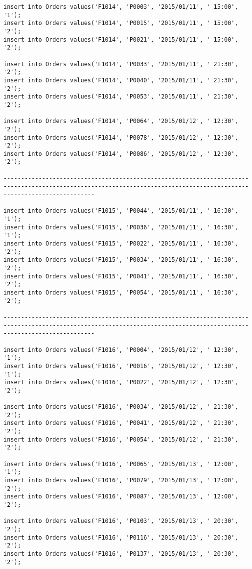 \documentclass[a4,12pt]{report}
\begin{document}
\begin{lstlisting}
insert into Orders values('F1014', 'P0003', '2015/01/11', ' 15:00', '1');
insert into Orders values('F1014', 'P0015', '2015/01/11', ' 15:00', '2');
insert into Orders values('F1014', 'P0021', '2015/01/11', ' 15:00', '2');

insert into Orders values('F1014', 'P0033', '2015/01/11', ' 21:30', '2');
insert into Orders values('F1014', 'P0040', '2015/01/11', ' 21:30', '2');
insert into Orders values('F1014', 'P0053', '2015/01/11', ' 21:30', '2');

insert into Orders values('F1014', 'P0064', '2015/01/12', ' 12:30', '2');
insert into Orders values('F1014', 'P0078', '2015/01/12', ' 12:30', '2');
insert into Orders values('F1014', 'P0086', '2015/01/12', ' 12:30', '2');

----------------------------------------------------------------------------------------------------------------------------------------------------------------------

insert into Orders values('F1015', 'P0044', '2015/01/11', ' 16:30', '1');
insert into Orders values('F1015', 'P0036', '2015/01/11', ' 16:30', '1');
insert into Orders values('F1015', 'P0022', '2015/01/11', ' 16:30', '2');
insert into Orders values('F1015', 'P0034', '2015/01/11', ' 16:30', '2');
insert into Orders values('F1015', 'P0041', '2015/01/11', ' 16:30', '2');
insert into Orders values('F1015', 'P0054', '2015/01/11', ' 16:30', '2');

----------------------------------------------------------------------------------------------------------------------------------------------------------------------

insert into Orders values('F1016', 'P0004', '2015/01/12', ' 12:30', '1');
insert into Orders values('F1016', 'P0016', '2015/01/12', ' 12:30', '1');
insert into Orders values('F1016', 'P0022', '2015/01/12', ' 12:30', '2');

insert into Orders values('F1016', 'P0034', '2015/01/12', ' 21:30', '2');
insert into Orders values('F1016', 'P0041', '2015/01/12', ' 21:30', '2');
insert into Orders values('F1016', 'P0054', '2015/01/12', ' 21:30', '2');

insert into Orders values('F1016', 'P0065', '2015/01/13', ' 12:00', '1');
insert into Orders values('F1016', 'P0079', '2015/01/13', ' 12:00', '2');
insert into Orders values('F1016', 'P0087', '2015/01/13', ' 12:00', '2');

insert into Orders values('F1016', 'P0103', '2015/01/13', ' 20:30', '2');
insert into Orders values('F1016', 'P0116', '2015/01/13', ' 20:30', '2');
insert into Orders values('F1016', 'P0137', '2015/01/13', ' 20:30', '2');


\end{lstlisting}
\end{document}
